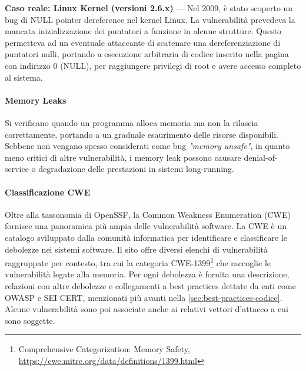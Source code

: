 \textbf{Caso reale: Linux Kernel (versioni 2.6.x)} — Nel 2009, è stato scoperto un
bug di NULL pointer dereference nel kernel Linux. La vulnerabilità prevedeva la
mancata inizializzazione dei puntatori a funzione in alcune strutture. Questo permetteva
ad un eventuale attaccante di scatenare una dereferenziazione di puntatori nulli,
portando a esecuzione arbitraria di codice inserito nella pagina con indirizzo 0
(NULL), per raggiungere privilegi di root e avere accesso completo al sistema.\cite{null_pointer_dereference_linux}

\paragraph{Memory Leaks}
\label{sec:memory_leaks} Si verificano quando un programma alloca memoria ma non
la rilascia correttamente, portando a un graduale esaurimento delle risorse
disponibili. Sebbene non vengano spesso considerati come bug \textit{"memory unsafe"}, in
quanto meno critici di altre vulnerabilità, i memory leak possono causare denial-of-service
o degradazione delle prestazioni in sistemi long-running.

\paragraph{Classificazione CWE}
Oltre alla tassonomia di OpenSSF, la Common Weakness Enumeration (CWE) fornisce una
panoramica più ampia delle vulnerabilità software. La CWE è un catalogo
sviluppato dalla comunità informatica per identificare e classificare le
debolezze nei sistemi software. Il sito offre diversi elenchi di vulnerabilità raggruppate
per contesto, tra cui la categoria CWE-1399\footnote{Comprehensive
Categorization: Memory Safety,
\url{https://cwe.mitre.org/data/definitions/1399.html}} che raccoglie le vulnerabilità
legate alla memoria. Per ogni debolezza è fornita una descrizione, relazioni con
altre debolezze e collegamenti a best practices dettate da enti come OWASP e SEI
CERT, menzionati più avanti nella \autoref{sec:best-practices-codice}. Alcune vulnerabilità
sono poi associate anche ai relativi vettori d'attacco a cui sono soggette.